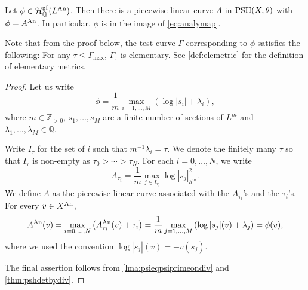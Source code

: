 \begin{lemma}\label{lma:gfinimage}
    Let $\phi \in \mathcal{H}^{\mathrm{gf}}_{\mathbb{Q}}(L^{\mathrm{An}})$. Then there is a piecewise linear curve $A$ in $\mathrm{PSH}(X,\theta)$ with $\phi=A^{\mathrm{An}}$. In particular, $\phi$ is in the image of \eqref{eq:analymap}.
\end{lemma}
Note that from the proof below, the test curve $\Gamma$ corresponding to $\phi$ satisfies the following: For any $\tau\leq \Gamma_{\max}$, $\Gamma_{\tau}$ is elementary. See \cref{def:elemetric} for the definition of elementary metrics.
\begin{proof}
     Let us write
    \begin{equation}\label{eq:phiintominversemax}
        \phi=\frac{1}{m}\max_{i=1,\ldots,M} \left(\log|s_i|+\lambda_i\right),
    \end{equation}
where $m\in \mathbb{Z}_{>0}$, $s_{1},\ldots, s_M$ are a finite number of sections of $L^m$ and $\lambda_1,\ldots,\lambda_M\in \mathbb{Q}$.

Write $I_{\tau}$ for the set of $i$ such that $m^{-1}\lambda_i=\tau$. We denote the finitely many $\tau$ so that $I_{\tau}$ is non-empty as $\tau_0> \cdots > \tau_N$.
For each $i=0,\ldots,N$, we write
\[
A_{\tau_i}=\frac{1}{m}\max_{j\in I_{\tau_i}} \log |s_j|^2_{h^m}.
\]
We define $A$ as the piecewise linear curve associated with the $A_{\tau_i}$'s and the $\tau_i$'s. For every $v\in X^{\mathrm{An}}$,
\[
A^{\mathrm{An}}(v)=\max_{i=0,\ldots,N}\left(A_{\tau_i}^{\mathrm{An}}(v)+\tau_i\right)
=\frac{1}{m}\max_{j=1,\ldots,M}\left(\log|s_j|(v)+\lambda_j\right)=\phi(v),
\]
where we used the convention $\log|s_j|(v)=-v(s_j)$.

The final assertion follows from \cref{lma:psieqpsiprimeondiv} and \cref{thm:pshdetbydiv}.
\end{proof}


